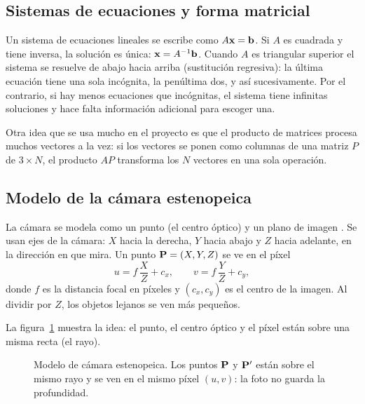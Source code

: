 \subsection{Sistemas de ecuaciones y forma matricial}

Un sistema de ecuaciones lineales se escribe como $A\mathbf{x}=\mathbf{b}$. Si $A$
es cuadrada y tiene inversa, la solución es única: $\mathbf{x}=A^{-1}\mathbf{b}$.
Cuando $A$ es triangular superior el sistema se resuelve de abajo hacia arriba
(sustitución regresiva): la última ecuación tiene una sola incógnita, la
penúltima dos, y así sucesivamente. Por el contrario, si hay menos ecuaciones
que incógnitas, el sistema tiene infinitas soluciones y hace falta información
adicional para escoger una.

Otra idea que se usa mucho en el proyecto es que el producto de matrices
procesa muchos vectores a la vez: si los vectores se ponen como columnas de una
matriz $P$ de $3\times N$, el producto $AP$ transforma los $N$ vectores en una
sola operación.



\subsection{Modelo de la cámara estenopeica}

La cámara se modela como un punto (el centro óptico) y un plano de imagen
\citep{hartley2004}. Se usan ejes de la cámara: $X$ hacia la derecha, $Y$ hacia
abajo y $Z$ hacia adelante, en la dirección en que mira. Un punto
$\mathbf{P}=(X,Y,Z)$ se ve en el píxel
\begin{equation}
u = f\,\frac{X}{Z} + c_x, \qquad v = f\,\frac{Y}{Z} + c_y,
\label{eq:proyeccion}
\end{equation}
donde $f$ es la distancia focal en píxeles y $(c_x,c_y)$ es el centro de la
imagen. Al dividir por $Z$, los objetos lejanos se ven más pequeños.

La figura~\ref{fig:camara} muestra la idea: el punto, el centro óptico y el
píxel están sobre una misma recta (el rayo).

\begin{figure}[htbp]
\centering
{}
\caption{Modelo de cámara estenopeica. Los puntos $\mathbf{P}$ y $\mathbf{P}'$ están
sobre el mismo rayo y se ven en el mismo píxel $(u,v)$: la foto no guarda la
profundidad.}
\label{fig:camara}
\end{figure}

